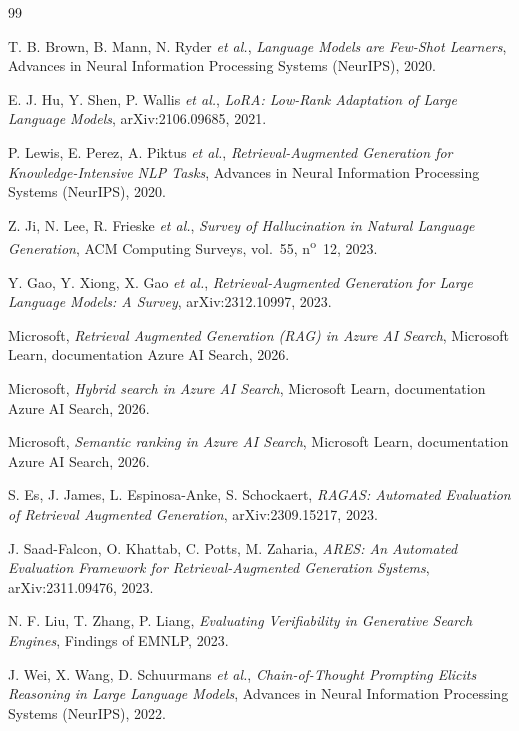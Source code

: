 \documentclass[12pt,a4paper]{article}
\begin{document}
\clearpage
{}
{}
\begin{thebibliography}{99}

 T. B. Brown, B. Mann, N. Ryder \emph{et al.}, \emph{Language Models are Few-Shot Learners}, Advances in Neural Information Processing Systems (NeurIPS), 2020.

 E. J. Hu, Y. Shen, P. Wallis \emph{et al.}, \emph{LoRA: Low-Rank Adaptation of Large Language Models}, arXiv:2106.09685, 2021.

 P. Lewis, E. Perez, A. Piktus \emph{et al.}, \emph{Retrieval-Augmented Generation for Knowledge-Intensive NLP Tasks}, Advances in Neural Information Processing Systems (NeurIPS), 2020.

 Z. Ji, N. Lee, R. Frieske \emph{et al.}, \emph{Survey of Hallucination in Natural Language Generation}, ACM Computing Surveys, vol.~55, n\textsuperscript{o}~12, 2023.

 Y. Gao, Y. Xiong, X. Gao \emph{et al.}, \emph{Retrieval-Augmented Generation for Large Language Models: A Survey}, arXiv:2312.10997, 2023.

 Microsoft, \emph{Retrieval Augmented Generation (RAG) in Azure AI Search}, Microsoft Learn, documentation Azure AI Search, 2026.

 Microsoft, \emph{Hybrid search in Azure AI Search}, Microsoft Learn, documentation Azure AI Search, 2026.

 Microsoft, \emph{Semantic ranking in Azure AI Search}, Microsoft Learn, documentation Azure AI Search, 2026.

 S. Es, J. James, L. Espinosa-Anke, S. Schockaert, \emph{RAGAS: Automated Evaluation of Retrieval Augmented Generation}, arXiv:2309.15217, 2023.

 J. Saad-Falcon, O. Khattab, C. Potts, M. Zaharia, \emph{ARES: An Automated Evaluation Framework for Retrieval-Augmented Generation Systems}, arXiv:2311.09476, 2023.

 N. F. Liu, T. Zhang, P. Liang, \emph{Evaluating Verifiability in Generative Search Engines}, Findings of EMNLP, 2023.

 J. Wei, X. Wang, D. Schuurmans \emph{et al.}, \emph{Chain-of-Thought Prompting Elicits Reasoning in Large Language Models}, Advances in Neural Information Processing Systems (NeurIPS), 2022.


\end{thebibliography}
\end{document}
